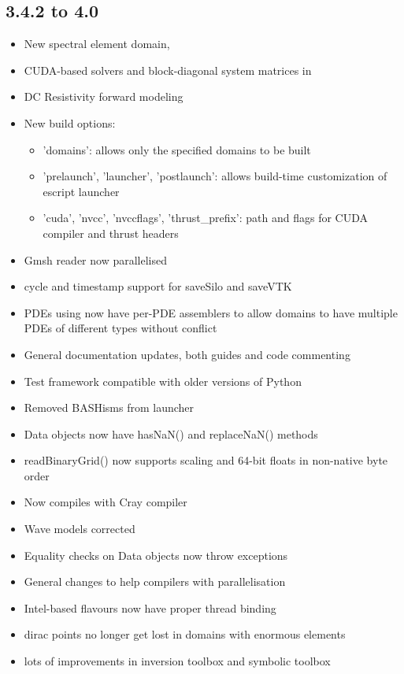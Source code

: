 \subsection*{3.4.2 to 4.0}
\begin{itemize}
  \item New spectral element domain, \speckley
  \item CUDA-based solvers and block-diagonal system matrices in \ripley
  \item DC Resistivity forward modeling
  \item New build options:
   \begin{itemize}
     \item 'domains': allows only the specified domains to be built
     \item 'prelaunch', 'launcher', 'postlaunch': allows build-time
           customization of escript launcher
     \item 'cuda', 'nvcc', 'nvccflags', 'thrust_prefix': path and flags for
           CUDA compiler and thrust headers
   \end{itemize}
  \item Gmsh reader now \MPI parallelised
  \item cycle and timestamp support for saveSilo and saveVTK
  \item PDEs using \ripley now have per-PDE assemblers to allow domains to have
        multiple PDEs of different types without conflict
  \item General documentation updates, both guides and code commenting
  \item Test framework compatible with older versions of Python
  \item Removed BASHisms from \escript launcher
  \item Data objects now have hasNaN() and replaceNaN() methods
  \item readBinaryGrid() now supports scaling and 64-bit floats in non-native
        byte order
  \item Now compiles with Cray compiler 
  \item Wave models corrected
  \item Equality checks on Data objects now throw exceptions
  \item General changes to help compilers with \OPENMP parallelisation
  \item Intel-based \OPENMP flavours now have proper thread binding
  \item \ripley dirac points no longer get lost in domains with enormous
        elements
  \item lots of improvements in inversion toolbox \downunder and symbolic
        toolbox
\end{itemize}

